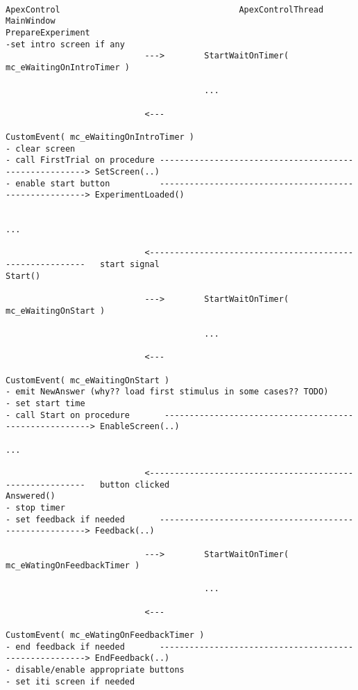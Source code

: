 \documentclass[a4paper,12pt]{article}
\begin{document}
\begin{landscape}
\label{main}
\begin{verbatim}

ApexControl                                    ApexControlThread                          MainWindow
PrepareExperiment
-set intro screen if any
                            --->        StartWaitOnTimer( mc_eWaitingOnIntroTimer )
                              
                                        ...
                                        
                            <---
                            
CustomEvent( mc_eWaitingOnIntroTimer )
- clear screen
- call FirstTrial on procedure -------------------------------------------------------> SetScreen(..)
- enable start button          -------------------------------------------------------> ExperimentLoaded()


...

                            <---------------------------------------------------------   start signal
Start()                      

                            --->        StartWaitOnTimer( mc_eWaitingOnStart )
                            
                                        ...
                                        
                            <---
                            
CustomEvent( mc_eWaitingOnStart )
- emit NewAnswer (why?? load first stimulus in some cases?? TODO)
- set start time
- call Start on procedure       -------------------------------------------------------> EnableScreen(..)

...

                            <---------------------------------------------------------   button clicked
Answered()
- stop timer
- set feedback if needed       -------------------------------------------------------> Feedback(..)

                            --->        StartWaitOnTimer( mc_eWatingOnFeedbackTimer )
                            
                                        ...
                                        
                            <---
                            
CustomEvent( mc_eWatingOnFeedbackTimer )
- end feedback if needed       -------------------------------------------------------> EndFeedback(..)
- disable/enable appropriate buttons
- set iti screen if needed


\end{verbatim}
\end{landscape}
\end{document}

